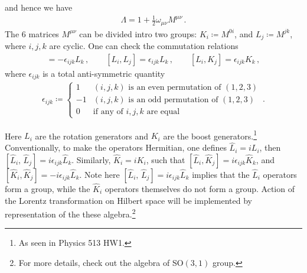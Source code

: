 \documentclass[11pt, onesided]{book}
\theoremstyle{break}
\theoremstyle{break}
\begin{document}
and hence we have
\begin{align*}
\Lambda = 1 + \frac{1}{2}\omega_{\mu\nu}M^{\mu\nu}\,.
\end{align*}
The $6$ matrices $M^{\mu\nu}$ can be divided intro two groups: $K_i \coloneqq M^{0i}$, and $L_j \coloneqq M^{jk}$, where $i,j,k$ are cyclic. One can check the commutation relations
\begin{align}
[K_i, K_j] = -\epsilon_{ijk} L_k\,,\qquad [L_i, L_j] = \epsilon_{ijk}L_k\,,\qquad
[L_i, K_j] = \epsilon_{ijk} K_k\,,
\end{align}
where $\epsilon_{ijk}$ is a total anti-symmetric quantity 
\begin{align*}
\epsilon_{ijk} \coloneqq \begin{cases}
1 & (i,j,k) \text{ is an even permutation of }(1,2,3)\\
-1 & (i,j,k) \text{ is an odd permutation of }(1,2,3)\\
0 & \text{if any of $i,j,k$ are equal}
\end{cases}\,.
\end{align*}

Here $L_i$ are the rotation generators and $K_i$ are the boost generators.\footnote{As seen in Physics 513 HW1.} \\

Conventionally, to make the operators Hermitian, one defines $\hat{L}_i = iL_i$, then $[\hat{L}_i , \, \hat{L}_j ] =i\epsilon_{ijk} \hat{L}_k$. Similarly, $\hat{K}_i = iK_i$, such that $[\hat{L}_i , \hat{K}_j ] = i\epsilon_{ijk}\hat{K}_k$, and $[\hat{K}_i, \hat{K}_j] = -i\epsilon_{ijk} \hat{L}_k$. Note here $[\hat{L}_i , \, \hat{L}_j ] =i\epsilon_{ijk} \hat{L}_k$ implies that the $\hat{L}_i$ operators form a group, while the $\hat{K}_i$ operators themselves do not form a group. Action of the Lorentz transformation on Hilbert space will be implemented by representation of the these algebra.\footnote{For more details, check out the algebra of SO$(3,1)$ group.}\\
\end{document}
